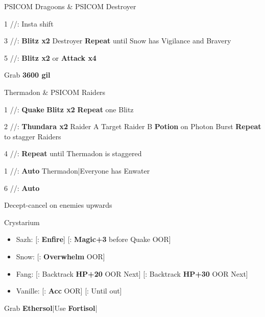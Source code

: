 \begin{fight}{PSICOM Dragoons \& PSICOM Destroyer}
	\item [1] \com/\syn/\com: Insta shift
	\item [3] \com/\syn/\sen: \textbf{Blitz x2} Destroyer \to \textbf{Repeat} until Snow has Vigilance and Bravery
	\item [5] \com/\com/\com: \textbf{Blitz x2} or \textbf{Attack x4}
\end{fight}
\begin{mainlist}
	\item Grab \textbf{3600 gil}
\end{mainlist}
\begin{fight}{Thermadon \& PSICOM Raiders}
	\item [1] \com/\syn/\com: \textbf{Quake} \to \textbf{Blitz x2} \to \textbf{Repeat} one Blitz
	\item [2] \rav/\rav/\rav: \textbf{Thundara x2} Raider A \to Target Raider B \to \textbf{Potion} on Photon Burst \to \textbf{Repeat} to stagger Raiders
	\item [4] \rav/\rav/\rav: \textbf{Repeat} until Thermadon is staggered
	\item [1] \com/\syn/\com: \textbf{Auto} Thermadon|Everyone has Enwater
	\item [6] \com/\com/\com: \textbf{Auto}
\end{fight}
\begin{mainlist}
	\item Decept-cancel on enemies upwards
\end{mainlist}
\begin{menu}
	\item Crystarium
	\begin{itemize}
		\item Sazh: [\syn: \textbf{Enfire}] [\com: \textbf{Magic+3} before Quake OOR]
		\item Snow: [\rav: \textbf{Overwhelm} OOR]
		\item Fang: [\com: Backtrack \textbf{HP+20} OOR \to Next] [\sab: Backtrack \textbf{HP+30} OOR \to Next]
		\item Vanille: [\sab: \textbf{Acc} OOR] [\med: Until out]
	\end{itemize}
\end{menu}
\begin{mainlist}
	\item Grab \textbf{Ethersol}|Use \textbf{Fortisol}|\skip
\end{mainlist}
